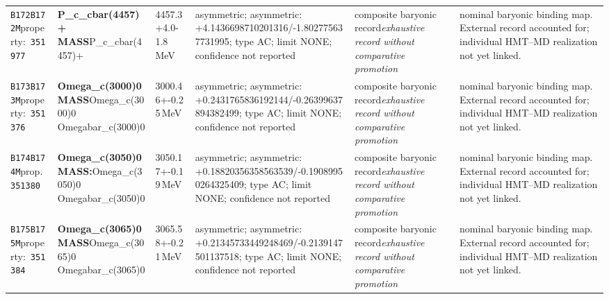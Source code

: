 \begin{landscape}
\begin{longtable}{L{1.85cm}L{4.45cm}L{2.35cm}L{4.05cm}L{3.35cm}L{7.15cm}}
\texttt{B172}\newline \texttt{B172M}\newline property:\ \texttt{351977} & \textbf{P\_\allowbreak{}c\_\allowbreak{}cbar(4457)+ MASS}\newline P\_\allowbreak{}c\_\allowbreak{}cbar(4457)+ & 4457.3+4.0-1.8\,MeV & asymmetric; asymmetric: +4.1436698710201316/-1.802775637731995; type AC; limit NONE; confidence not reported & composite baryonic record\newline \emph{exhaustive record without comparative promotion} & nominal baryonic binding map. External record accounted for; individual HMT--MD realization not yet linked. \\
\texttt{B173}\newline \texttt{B173M}\newline property:\ \texttt{351376} & \textbf{Omega\_\allowbreak{}c(3000)0 MASS}\newline Omega\_\allowbreak{}c(3000)0 \textbar{}\allowbreak{} Omegabar\_\allowbreak{}c(3000)0 & 3000.46+-0.25\,MeV & asymmetric; asymmetric: +0.2431765836192144/-0.26399637894382499; type AC; limit NONE; confidence not reported & composite baryonic record\newline \emph{exhaustive record without comparative promotion} & nominal baryonic binding map. External record accounted for; individual HMT--MD realization not yet linked. \\
\texttt{B174}\newline \texttt{B174M}\newline prop.\ \texttt{351380} & \textbf{Omega\_\allowbreak{}c(3050)0 MASS:}\newline Omega\_\allowbreak{}c(3050)0 \textbar{}\allowbreak{} Omegabar\_\allowbreak{}c(3050)0 & 3050.17+-0.19\,MeV & asymmetric; asymmetric: +0.18820356358563539/-0.19089950264325409; type AC; limit NONE; confidence not reported & composite baryonic record\newline \emph{exhaustive record without comparative promotion} & nominal baryonic binding map. External record accounted for; individual HMT--MD realization not yet linked. \\
\texttt{B175}\newline \texttt{B175M}\newline property:\ \texttt{351384} & \textbf{Omega\_\allowbreak{}c(3065)0 MASS}\newline Omega\_\allowbreak{}c(3065)0 \textbar{}\allowbreak{} Omegabar\_\allowbreak{}c(3065)0 & 3065.58+-0.21\,MeV & asymmetric; asymmetric: +0.21345733449248469/-0.2139147501137518; type AC; limit NONE; confidence not reported & composite baryonic record\newline \emph{exhaustive record without comparative promotion} & nominal baryonic binding map. External record accounted for; individual HMT--MD realization not yet linked. \\

\end{longtable}
\end{landscape}
